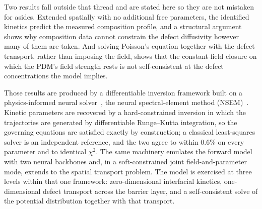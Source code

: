\documentclass[pdflatex,sn-nature]{sn-jnl}
\begin{document}
Two results fall outside that thread and are stated here so they are not
mistaken for asides. Extended spatially with no additional free
parameters, the identified kinetics predict the measured composition
profile, and a structural argument shows why composition data cannot
constrain the defect diffusivity however many of them are taken. And
solving Poisson's equation together with the defect transport, rather
than imposing the field, shows that the constant-field closure on which
the PDM's field strength rests is not self-consistent at the defect
concentrations the model implies.

Those results are produced by a differentiable inversion framework
built on a physics-informed neural
solver~\citep{raissi2019pinn,karniadakis2021piml}, the neural
spectral-element method (NSEM)~\citep{feugmo2026nsem}. Kinetic parameters
are recovered by a hard-constrained inversion in which the trajectories
are generated by differentiable Runge--Kutta integration, so the
governing equations are satisfied exactly by construction; a classical
least-squares solver is an independent reference, and the two
agree to within 0.6\% on every parameter and to identical $\chi^2$. The
same machinery emulates the forward model with two neural backbones and,
in a soft-constrained joint field-and-parameter mode, extends to the
spatial transport problem. The model is exercised at three levels within
that one framework: zero-dimensional interfacial kinetics, one-dimensional
defect transport across the barrier layer, and a self-consistent solve of
the potential distribution together with that transport.
\end{document}
